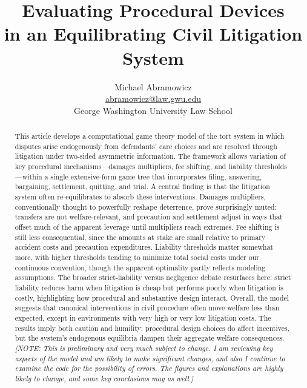\documentclass{article}
\newenvironment{nohyphen}
  {\hyphenpenalty=10000 \exhyphenpenalty=10000 \sloppy}
  {\par}
\begin{document}
\title{Evaluating Procedural Devices \\ in an Equilibrating Civil Litigation System}
\author{Michael Abramowicz \\ \href{mailto:abramowicz@law.gwu.edu}{abramowicz@law.gwu.edu} \\ George Washington University Law School}

\maketitle

\begin{abstract}
\begin{nohyphen}
This article develops a computational game theory model of the tort system in which disputes arise endogenously from defendants’ care choices and are resolved through litigation under two-sided asymmetric information. The framework allows variation of key procedural mechanisms—damages multipliers, fee shifting, and liability thresholds—within a single extensive-form game tree that incorporates filing, answering, bargaining, settlement, quitting, and trial. A central finding is that the litigation system often re-equilibrates to absorb these interventions. Damages multipliers, conventionally thought to powerfully reshape deterrence, prove surprisingly muted: transfers are not welfare-relevant, and precaution and settlement adjust in ways that offset much of the apparent leverage until multipliers reach extremes. Fee shifting is still less consequential, since the amounts at stake are small relative to primary accident costs and precaution expenditures. Liability thresholds matter somewhat more, with higher thresholds tending to minimize total social costs under our continuous convention, though the apparent optimality partly reflects modeling assumptions. The broader strict-liability versus negligence debate resurfaces here: strict liability reduces harm when litigation is cheap but performs poorly when litigation is costly, highlighting how procedural and substantive design interact. Overall, the model suggests that canonical interventions in civil procedure often move welfare less than expected, except in environments with very high or very low litigation costs. The results imply both caution and humility: procedural design choices do affect incentives, but the system’s endogenous equilibria dampen their aggregate welfare consequences. \emph{[NOTE: This is preliminary and very much subject to change. I am reviewing key aspects of the model and am likely to make significant changes, and also I continue to examine the code for the possibility of errors. The figures and explanations are highly likely to change, and some key conclusions may as well.]} 
\end{nohyphen}
\end{abstract}
\end{document}
